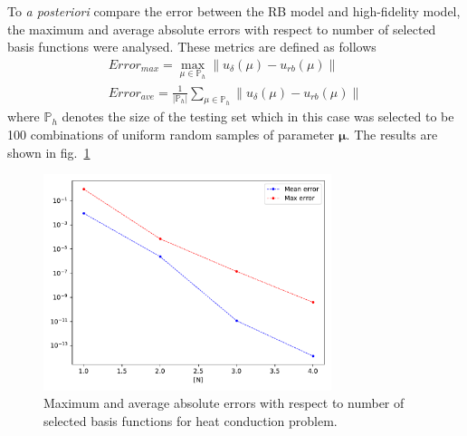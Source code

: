 \documentclass[11pt, oneside]{article}
\begin{document}
To \textit{a posteriori} compare the error between the RB model and high-fidelity model, the maximum and average absolute errors with respect to number of selected basis functions were analysed. These metrics are defined as follows
\begin{align}
  Error_{max} = \max_{\mu \in \mathbb{P}_h} \|u_{\delta}(\mu) - u_{rb}(\mu)\| \\
  Error_{ave} = \frac{1}{|\mathbb{P}_h|} \sum_{\mu \in \mathbb{P}_h} \|u_{\delta}(\mu) - u_{rb}(\mu)\|
\end{align}
where $\mathbb{P}_h$ denotes the size of the testing set which in this case was selected to be 100 combinations of uniform random samples of parameter $\mathbf{\mu}$. The results are shown in fig.~\ref{fig:tb_err}
    \begin{figure}[h!]
        \centering
        \includegraphics[width=0.75\textwidth]{figures/output_error.pdf}
        \caption{Maximum and average absolute errors with respect to number of selected basis functions for heat conduction problem.}
        \label{fig:tb_err}
    \end{figure}
\end{document}
